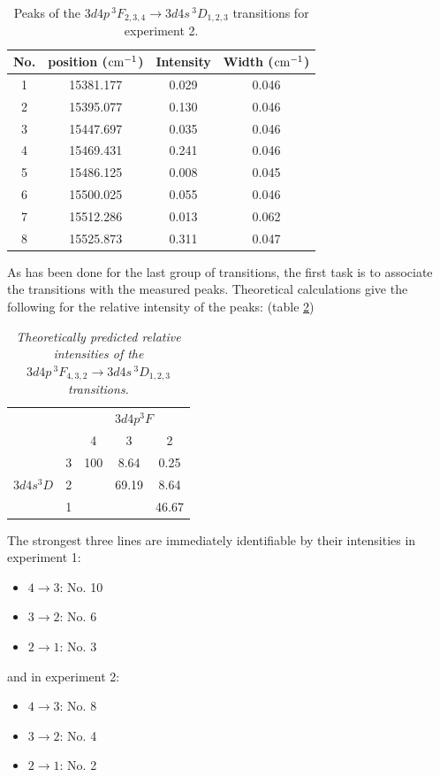 \documentclass[a4paper]{article}
\begin{document}
\begin{table}[htb!]
\centering
\begin{tabular}{c|c|c|c}
\hline
No. & position ($\rm cm^{-1}$) & Intensity & Width ($\rm cm^{-1}$) \\
\hline
1 & 15381.177 & 0.029 & 0.046 \\
2 & 15395.077 & 0.130 & 0.046 \\
3 & 15447.697 & 0.035 & 0.046 \\
4 & 15469.431 & 0.241 & 0.046 \\
5 & 15486.125 & 0.008 & 0.045 \\
6 & 15500.025 & 0.055 & 0.046 \\
7 & 15512.286 & 0.013 & 0.062 \\
8 & 15525.873 & 0.311 & 0.047 \\
\hline
\end{tabular}
\caption{Peaks of the $3d4p\,^3F_{2,3,4} \to 3d4s\,^3D_{1,2,3}$ transitions for experiment 2.}
\label{tab:transitions22}
\end{table}

As has been done for the last group of transitions, the first task is to associate
the transitions with the measured peaks.  Theoretical calculations give the following
for the relative intensity of the peaks: (table \ref{tab:intensity2})
\begin{table}[htb!]
\centering
\begin{tabular}{cc|c|c|c|}
\cline{3-5}
& & \multicolumn{3}{c|}{$3d4p ^3F$}\\
\cline{3-5}
& & 4 & 3 & 2\\
\hline
\multicolumn{1}{|c|}{\multirow{3}{*}{$3d4s ^3D$}} & 3 & 100 & 8.64 & 0.25\\
\multicolumn{1}{|c|}{} & 2 &  & 69.19 & 8.64 \\
\multicolumn{1}{|c|}{} & 1 & & & 46.67 \\
\hline
\end{tabular}
\caption{\it Theoretically predicted relative intensities of the
  $3d4p\,^3F_{4,3,2} \to 3d4s\,^3D_{1,2,3}$ transitions.}
\label{tab:intensity2}
\end{table}

The strongest three lines are immediately identifiable by their
intensities in experiment 1:
\begin{itemize}
\item $4 \to 3$: No. 10
\item $3 \to 2$: No. 6
\item $2 \to 1$: No. 3
\end{itemize}
and in experiment 2:
\begin{itemize}
\item $4 \to 3$: No. 8
\item $3 \to 2$: No. 4
\item $2 \to 1$: No. 2
\end{itemize}
\end{document}
